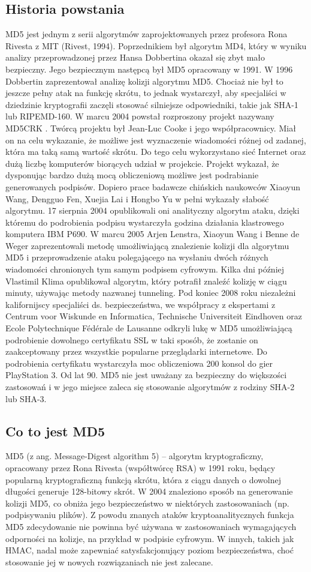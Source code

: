 \documentclass[12pt, a4paper]{article}
\begin{document}
\subsection{Historia powstania}
MD5 jest jednym z serii algorytmów zaprojektowanych przez profesora Rona Rivesta z MIT (Rivest, 1994). Poprzednikiem był algorytm MD4, który w wyniku analizy przeprowadzonej przez Hansa Dobbertina okazał się zbyt mało bezpieczny. Jego bezpiecznym następcą był MD5 opracowany w 1991.
W 1996 Dobbertin zaprezentował analizę kolizji algorytmu MD5. Chociaż nie był to jeszcze pełny atak na funkcję skrótu, to jednak wystarczył, aby specjaliści w dziedzinie kryptografii zaczęli stosować silniejsze odpowiedniki, takie jak SHA-1 lub RIPEMD-160.
W marcu 2004 powstał rozproszony projekt nazywany MD5CRK . Twórcą projektu był Jean-Luc Cooke i jego współpracownicy. Miał on na celu wykazanie, że możliwe jest wyznaczenie wiadomości różnej od zadanej, która ma taką samą wartość skrótu. Do tego celu wykorzystano sieć Internet oraz dużą liczbę komputerów biorących udział w projekcie. Projekt wykazał, że dysponując bardzo dużą mocą obliczeniową możliwe jest podrabianie generowanych podpisów.
Dopiero prace badawcze chińskich naukowców Xiaoyun Wang, Dengguo Fen, Xuejia Lai i Hongbo Yu w pełni wykazały słabość algorytmu. 17 sierpnia 2004 opublikowali oni analityczny algorytm ataku, dzięki któremu do podrobienia podpisu wystarczyła godzina działania klastrowego komputera IBM P690.
W marcu 2005 Arjen Lenstra, Xiaoyun Wang i Benne de Weger zaprezentowali metodę umożliwiającą znalezienie kolizji dla algorytmu MD5 i przeprowadzenie ataku polegającego na wysłaniu dwóch różnych wiadomości chronionych tym samym podpisem cyfrowym. Kilka dni później Vlastimil Klima opublikował algorytm, który potrafił znaleźć kolizję w ciągu minuty, używając metody nazwanej tunneling.
Pod koniec 2008 roku niezależni kalifornijscy specjaliści ds. bezpieczeństwa, we współpracy z ekspertami z Centrum voor Wiskunde en Informatica, Technische Universiteit Eindhoven oraz Ecole Polytechnique Fédérale de Lausanne odkryli lukę w MD5 umożliwiającą podrobienie dowolnego certyfikatu SSL w taki sposób, że zostanie on zaakceptowany przez wszystkie popularne przeglądarki internetowe. Do podrobienia certyfikatu wystarczyła moc obliczeniowa 200 konsol do gier PlayStation 3.
Od lat 90. MD5 nie jest uważany za bezpieczny do większości zastosowań i w jego miejsce zaleca się stosowanie algorytmów z rodziny SHA-2 lub SHA-3.
\subsection{Co to jest MD5}
MD5 (z ang. Message-Digest algorithm 5) – algorytm kryptograficzny, opracowany przez Rona Rivesta (współtwórcę RSA) w 1991 roku, będący popularną kryptograficzną funkcją skrótu, która z ciągu danych o dowolnej długości generuje 128-bitowy skrót.
W 2004 znaleziono sposób na generowanie kolizji MD5, co obniża jego bezpieczeństwo w niektórych zastosowaniach (np. podpisywaniu plików).
Z powodu znanych ataków kryptoanalitycznych funkcja MD5 zdecydowanie nie powinna być używana w zastosowaniach wymagających odporności na kolizje, na przykład w podpisie cyfrowym. W innych, takich jak HMAC, nadal może zapewniać satysfakcjonujący poziom bezpieczeństwa, choć stosowanie jej w nowych rozwiązaniach nie jest zalecane.
\end{document}

